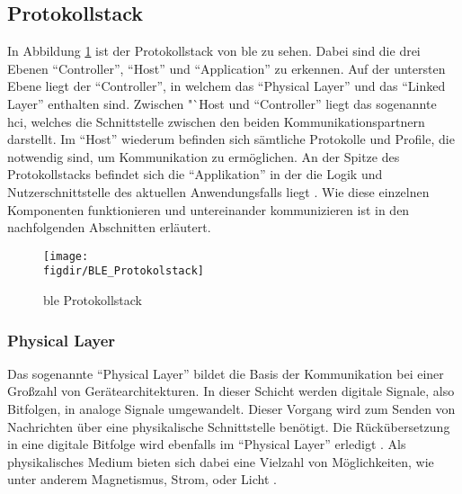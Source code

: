 \subsection{Protokollstack}
\label{ss:funktionsweise:protokollstack}

In Abbildung \ref{FIG:protokollstack} ist der Protokollstack von \ac{ble} zu sehen. Dabei sind die drei Ebenen "`Controller"', "`Host"' und "`Application"' zu erkennen. Auf der untersten Ebene liegt der "`Controller"', in welchem das "`Physical Layer"' und das "`Linked Layer"' enthalten sind. Zwischen "`Host und "`Controller"' liegt das sogenannte \ac{hci}, welches die Schnittstelle zwischen den beiden Kommunikationspartnern darstellt. Im "`Host"' wiederum befinden sich sämtliche Protokolle und Profile, die notwendig sind, um Kommunikation zu ermöglichen. An der Spitze des Protokollstacks befindet sich die "`Applikation"' in der die Logik und Nutzerschnittstelle des aktuellen Anwendungsfalls liegt \cite[15]{Townsend14:GSB}. Wie diese einzelnen Komponenten funktionieren und untereinander kommunizieren ist in den nachfolgenden Abschnitten erläutert.\\  
 
\begin{figure}[h]
\centering
\texttt{[image: \\figdir/BLE\_Protokolstack]}
\caption{\ac{ble} Protokollstack \cite[Seite 16]{Townsend14:GSB}}
\label{FIG:protokollstack}
\end{figure}

\subsubsection{Physical Layer}
\label{sss:funktionsweise:physical}

Das sogenannte "`Physical Layer"' bildet die Basis der Kommunikation bei einer Großzahl von Gerätearchitekturen. In dieser Schicht werden digitale Signale, also Bitfolgen, in analoge Signale umgewandelt. Dieser Vorgang wird zum Senden von Nachrichten über eine physikalische Schnittstelle benötigt. Die Rückübersetzung in eine digitale Bitfolge wird ebenfalls im "`Physical Layer"' erledigt \cite[Seite 16]{Townsend14:GSB}. Als physikalisches Medium bieten sich dabei eine Vielzahl von Möglichkeiten, wie unter anderem Magnetismus, Strom, oder Licht \cite[Seite 95 - 101]{Tanenbaum14:CN}.\\

